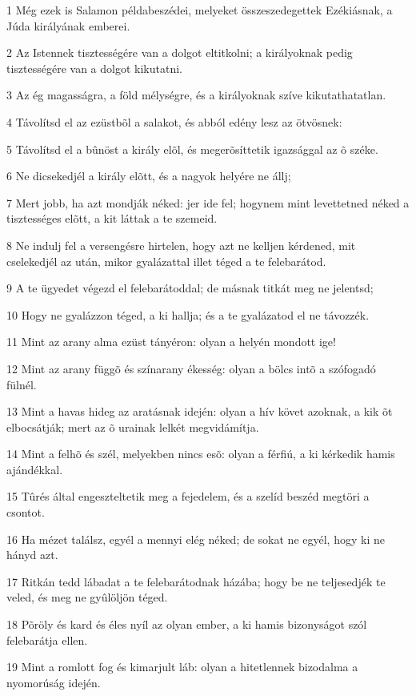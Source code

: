 \par 1 Még ezek is Salamon példabeszédei, melyeket összeszedegettek Ezékiásnak, a Júda királyának emberei.
\par 2 Az Istennek tisztességére van a dolgot eltitkolni; a királyoknak pedig tisztességére van a dolgot kikutatni.
\par 3 Az ég magasságra, a föld mélységre, és a királyoknak szíve kikutathatatlan.
\par 4 Távolítsd el az ezüstbõl a salakot, és abból edény lesz az ötvösnek:
\par 5 Távolítsd el a bûnöst a király elõl, és megerõsíttetik igazsággal az õ széke.
\par 6 Ne dicsekedjél a király elõtt, és a nagyok helyére ne állj;
\par 7 Mert jobb, ha azt mondják néked: jer ide fel; hogynem mint levettetned néked a tisztességes elõtt, a kit láttak a te szemeid.
\par 8 Ne indulj fel a versengésre hirtelen, hogy azt ne kelljen kérdened, mit cselekedjél az után, mikor gyalázattal illet téged a te felebarátod.
\par 9 A te ügyedet végezd el felebarátoddal; de másnak titkát meg ne jelentsd;
\par 10 Hogy ne gyalázzon téged, a ki hallja; és a te gyalázatod el ne távozzék.
\par 11 Mint az arany alma ezüst tányéron: olyan a helyén mondott ige!
\par 12 Mint az arany függõ és színarany ékesség: olyan a bölcs intõ a szófogadó fülnél.
\par 13 Mint a havas hideg az aratásnak idején: olyan a hív követ azoknak, a kik õt elbocsátják; mert az õ urainak lelkét megvidámítja.
\par 14 Mint a felhõ és szél, melyekben nincs esõ: olyan a férfiú, a ki kérkedik hamis ajándékkal.
\par 15 Tûrés által engeszteltetik meg a fejedelem, és a szelíd beszéd megtöri a csontot.
\par 16 Ha mézet találsz, egyél a mennyi elég néked; de sokat ne egyél, hogy ki ne hányd azt.
\par 17 Ritkán tedd lábadat a te felebarátodnak házába; hogy be ne teljesedjék te veled, és meg ne gyûlöljön téged.
\par 18 Põröly és kard és éles nyíl az olyan ember, a ki hamis bizonyságot szól felebarátja ellen.
\par 19 Mint a romlott fog és kimarjult láb: olyan a hitetlennek bizodalma a nyomorúság idején.
